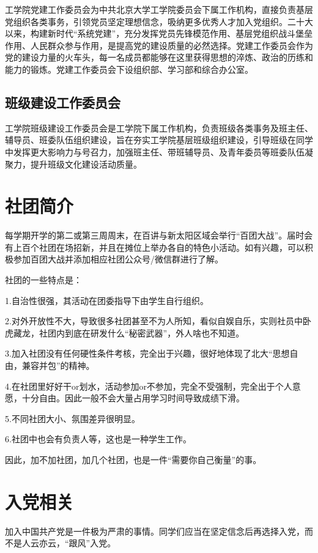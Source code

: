 工学院党建工作委员会为中共北京大学工学院委员会下属工作机构，直接负责基层党组织各类事务，引领党员坚定理想信念，吸纳更多优秀人才加入党组织。二十大以来，构建新时代“系统党建”，充分发挥党员先锋模范作用、基层党组织战斗堡垒作用、人民群众参与作用，是提高党的建设质量的必然选择。党建工作委员会作为党的建设力量的火车头，每一名成员都能够在这里获得思想的淬炼、政治的历练和能力的锻炼。党建工作委员会下设组织部、学习部和综合办公室。

\vspace{10pt}


\subsection{班级建设工作委员会}

工学院班级建设工作委员会是工学院下属工作机构，负责班级各类事务及班主任、辅导员、班委队伍组织建设，旨在夯实工学院基层班级组织建设，引导班级在同学中发挥更大影响力与号召力，加强班主任、带班辅导员、及青年委员等班委队伍凝聚力，提升班级文化建设活动质量。

\section{社团简介}
每学期开学的第二或第三周周末，在百讲与新太阳区域会举行“百团大战”。届时会有上百个社团在场招新，并且在摊位上举办各自的特色小活动。如有兴趣，可以积极参加百团大战并添加相应社团公众号/微信群进行了解。

\vspace{10pt}

社团的一些特点是：

1.自治性很强，其活动在团委指导下由学生自行组织。

2.对外开放性不大，导致很多社团甚至不为人所知，看似自娱自乐，实则社员中卧虎藏龙，社团内到底在研发什么“秘密武器”，外人啥也不知道。

3.加入社团没有任何硬性条件考核，完全出于兴趣，很好地体现了北大“思想自由，兼容并包”的精神。

4.在社团里好好干or划水，活动参加or不参加，完全不受强制，完全出于个人意愿，十分自由。因此一般不会大量占用学习时间导致成绩下滑。

5.不同社团大小、氛围差异很明显。

6.社团中也会有负责人等，这也是一种学生工作。 

\vspace{10pt}

因此，加不加社团，加几个社团，也是一件“需要你自己衡量”的事。

\section{入党相关}
加入中国共产党是一件极为严肃的事情。同学们应当在坚定信念后再选择入党，而不是人云亦云，“跟风”入党。

